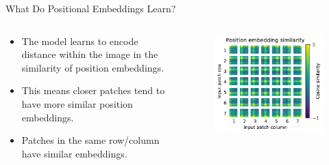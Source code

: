 \begin{frame}{What Do Positional Embeddings Learn?}
    \begin{columns}
        \begin{column}{0.6\textwidth}
            \begin{itemize}
                \item The model learns to encode distance within the image in the similarity of position embeddings.
                \item This means closer patches tend to have more similar position embeddings. 
                \item Patches in the same row/column have similar embeddings.
            \end{itemize}
        \end{column}
        \begin{column}{0.4\textwidth}
            \begin{figure}
                \centering
                \includegraphics[width=\linewidth]{pic/20201002_position_embeddings_17085772_1.pdf}
                \label{fig:pos_encodings}
            \end{figure}
        \end{column}
    \end{columns}
\end{frame}

